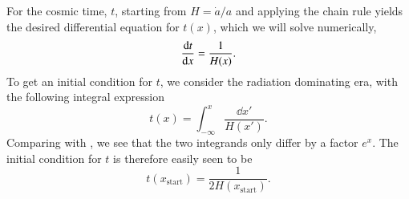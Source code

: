 For the cosmic time, $t$, starting from $H=\dot{a}/a$ and applying the chain rule yields the desired differential equation for $t(x)$, which we will solve numerically, 
\begin{equation}
    \dv{t}{x} = \frac{1}{H(x)}. \label{eq:M1:theory:cosmic_time_ODE}
\end{equation}
To get an initial condition for $t$, we consider the radiation dominating era, with the following integral expression 
\begin{equation}
    t(x) = \int_{-\infty}^x \frac{\dd x'}{H(x')}. \label{eq:M1:theory:t_of_x_integral_expression}
\end{equation} 
%
Comparing with , we see that the two integrands only differ by a factor $e^x$. The initial condition for $t$ is therefore easily seen to be  
\begin{equation}
    t(x_\mathrm{start}) = \frac{1}{2H(x_\mathrm{start})}. \label{eq:M1:theory:t_of_xstart_analytical_approximation}
\end{equation} 

